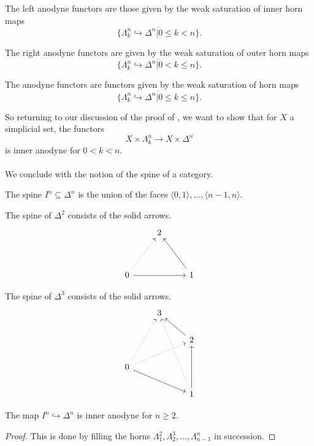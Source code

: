 \begin{definition}
  The left anodyne functors are those given by the weak saturation of inner horn maps
  $$\overline{\{\Lambda^{n}_{k}\hookrightarrow\Delta^{n}|0\leq k< n\}}.$$
\end{definition}
\begin{definition}
  The right anodyne functors are given by the weak saturation of outer horn maps 
  $$\overline{\{\Lambda^{n}_{k}\hookrightarrow\Delta^{n}|0< k\leq n\}}.$$
\end{definition}
\begin{definition}[Anodyne]
  The anodyne functors are functors given by the weak saturation of horn maps 
  $$\overline{\{\Lambda^{n}_{k}\hookrightarrow\Delta^{n}|0\leq k\leq n\}}.$$
\end{definition}
So returning to our discussion of the proof of , we want to show that for $X$ a simplicial set, the functors
$$X\times\Lambda^{n}_{k}\to X\times \Delta^{n}$$
is inner anodyne for $0<k<n$. 
\\\\
We conclude with the notion of the spine of a category. 
\begin{definition}[Spine]\label{def:spine}
  The spine $I^{n}\subseteq\Delta^{n}$ is the union of the faces $\langle0,1\rangle,\dots,\langle n-1,n\rangle$. 
\end{definition}
\begin{example}
  The spine of $\Delta^{2}$ consists of the solid arrows. 
  $$%
  \begin{tikzcd}
    & 2 \\
    \\
    0 && 1
    \arrow[from=3-1, to=3-3]
    \arrow[from=3-3, to=1-2]
    \arrow[dotted, from=3-1, to=1-2]
  \end{tikzcd}$$
\end{example}
\begin{example}
  The spine of $\Delta^{3}$ consists of the solid arrows. 
  $$%
  \begin{tikzcd}
    & 3 \\
    && 2 \\
    0 \\
    && 1
    \arrow[dotted, from=3-1, to=2-3]
    \arrow[from=3-1, to=4-3]
    \arrow[from=4-3, to=2-3]
    \arrow[from=2-3, to=1-2]
    \arrow[dotted, from=3-1, to=1-2]
    \arrow[dotted, from=4-3, to=1-2]
  \end{tikzcd}$$
\end{example}
\begin{proposition}
  The map $I^{n}\hookrightarrow\Delta^{n}$ is inner anodyne for $n\geq 2$. 
\end{proposition}
\begin{proof}
  This is done by filling the horns $\Lambda^{2}_{1}, \Lambda^{3}_{2},\dots,\Lambda^{n}_{n-1}$ in succession. 
\end{proof}